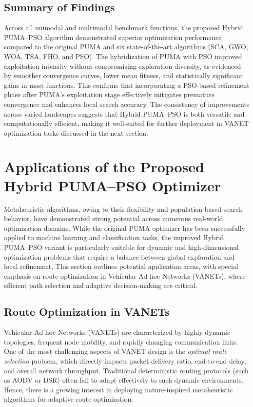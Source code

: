 \documentclass[a4paper,12pt]{article}
\begin{document}
\subsection{Summary of Findings}
\label{sec:summary-findings}

Across all unimodal and multimodal benchmark functions, the proposed Hybrid PUMA–PSO algorithm demonstrated superior optimization performance compared to the original PUMA and six state-of-the-art algorithms (SCA, GWO, WOA, TSA, FHO, and PSO). 
The hybridization of PUMA with PSO improved exploitation intensity without compromising exploration diversity, as evidenced by smoother convergence curves, lower mean fitness, and statistically significant gains in most functions. 
This confirms that incorporating a PSO-based refinement phase after PUMA’s exploitation stage effectively mitigates premature convergence and enhances local search accuracy. 
The consistency of improvements across varied landscapes suggests that Hybrid PUMA–PSO is both versatile and computationally efficient, making it well-suited for further deployment in VANET optimization tasks discussed in the next section.

\section{Applications of the Proposed Hybrid PUMA–PSO Optimizer}
\label{sec:applications}

Metaheuristic algorithms, owing to their flexibility and population-based search behavior, have demonstrated strong potential across numerous real-world optimization domains. 
While the original PUMA optimizer has been successfully applied to machine learning and classification tasks, the improved Hybrid PUMA–PSO variant is particularly suitable for dynamic and high-dimensional optimization problems that require a balance between global exploration and local refinement. 
This section outlines potential application areas, with special emphasis on route optimization in Vehicular Ad-hoc Networks (VANETs), where efficient path selection and adaptive decision-making are critical.

\subsection{Route Optimization in VANETs}
Vehicular Ad-hoc Networks (VANETs) are characterized by highly dynamic topologies, frequent node mobility, and rapidly changing communication links. 
One of the most challenging aspects of VANET design is the \textit{optimal route selection} problem, which directly impacts packet delivery ratio, end-to-end delay, and overall network throughput. 
Traditional deterministic routing protocols (such as AODV or DSR) often fail to adapt effectively to such dynamic environments. 
Hence, there is a growing interest in deploying nature-inspired metaheuristic algorithms for adaptive route optimization.
\end{document}
